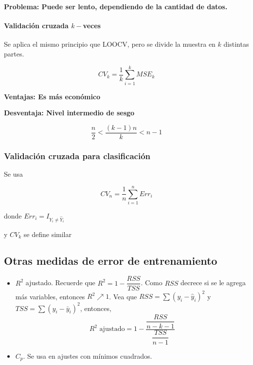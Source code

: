 \documentclass[
  12pt,
]{book}
\theoremstyle{definition}
\theoremstyle{definition}
\theoremstyle{definition}
\theoremstyle{remark}
\begin{document}
\textbf{Problema: Puede ser lento, dependiendo de la cantidad de datos.}

\hypertarget{validaciuxf3n-cruzada-k-veces}{%
\paragraph{\texorpdfstring{Validación cruzada \(k-\)veces}{Validación cruzada k-veces}}\label{validaciuxf3n-cruzada-k-veces}}

Se aplica el mismo principio que LOOCV, pero se divide la muestra en \(k\) distintas partes.

\begin{equation*}
CV_{k} = \frac{1}{k} \sum_{i=1}^{k} MSE_{k}
\end{equation*}

\textbf{Ventajas: Es más económico}

\textbf{Desventaja: Nivel intermedio de sesgo}

\begin{equation*}
\frac{n}{2} < \frac{(k-1)n}{k} < n-1
\end{equation*}

\hypertarget{validaciuxf3n-cruzada-para-clasificaciuxf3n}{%
\subsubsection{Validación cruzada para clasificación}\label{validaciuxf3n-cruzada-para-clasificaciuxf3n}}

Se usa

\begin{equation*}
CV_{n} = \frac{1}{n} \sum_{i=1}^{n} Err_{i}
\end{equation*}

donde \(Err_i = I_{Y_i \neq \hat{Y}_{i}}\)

y \(CV_{k}\) se define similar

\hypertarget{otras-medidas-de-error-de-entrenamiento}{%
\subsection{Otras medidas de error de entrenamiento}\label{otras-medidas-de-error-de-entrenamiento}}

\begin{itemize}
\item
  \(R^2\) ajustado. Recuerde que \(R^2 = 1 - \dfrac{RSS}{TSS}\). Como \(RSS\) decrece si se le agrega más variables, entonces \(R^2 \nearrow 1\). Vea que \(RSS = \sum(y_i-\hat{y}_i)^2\) y \(TSS = \sum(y_i-\bar{y}_i)^2\), entonces,
  \[R^2 \text{ ajustado}= 1-\dfrac{\dfrac{RSS}{n-k-1}}{\dfrac{TSS}{n-1}}\]
\item
  \(C_p\). Se usa en ajustes con mínimos cuadrados.
\end{itemize}
\end{document}
